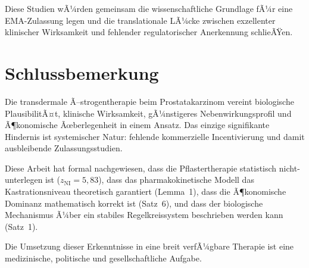 ﻿\documentclass[a4paper,12pt]{article}
\theoremstyle{definition}
\begin{document}
Diese Studien wÃ¼rden gemeinsam die wissenschaftliche Grundlage fÃ¼r eine EMA-Zulassung legen und die translationale LÃ¼cke zwischen exzellenter klinischer Wirksamkeit und fehlender regulatorischer Anerkennung schlieÃŸen.

\section{Schlussbemerkung}

Die transdermale Ã–strogentherapie beim Prostatakarzinom vereint biologische PlausibilitÃ¤t, klinische Wirksamkeit, gÃ¼nstigeres Nebenwirkungsprofil und Ã¶konomische Ãœberlegenheit in einem Ansatz.
Das einzige signifikante Hindernis ist systemischer Natur: fehlende kommerzielle Incentivierung und damit ausbleibende Zulassungsstudien.

Diese Arbeit hat formal nachgewiesen, dass die Pflastertherapie statistisch nicht-unterlegen ist ($z_{\mathrm{NI}} = 5{,}83$), dass das pharmakokinetische Modell das Kastrationsniveau theoretisch garantiert (Lemma~1), dass die Ã¶konomische Dominanz mathematisch korrekt ist (Satz~6), und dass der biologische Mechanismus Ã¼ber ein stabiles Regelkreissystem beschrieben werden kann (Satz~1).

Die Umsetzung dieser Erkenntnisse in eine breit verfÃ¼gbare Therapie ist eine medizinische, politische und gesellschaftliche Aufgabe.
\end{document}
